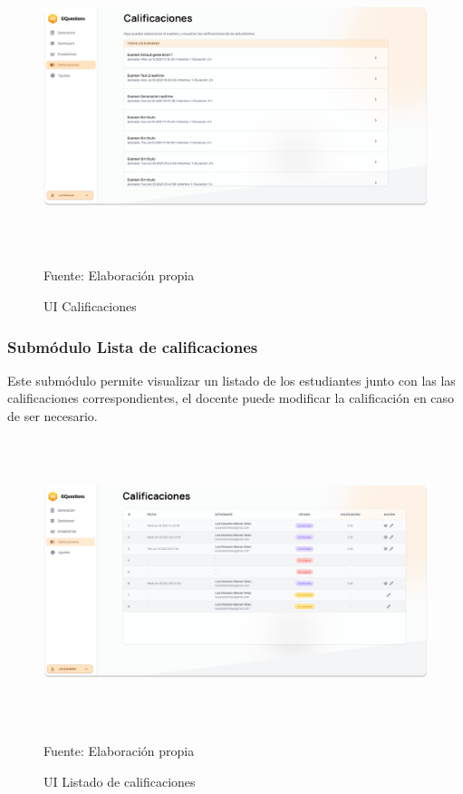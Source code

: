 \documentclass[../Main.tex]{subfiles}
\begin{document}
    \begin{figure}[H]
	\begin{Center}
		\includegraphics[width=6.4in,height=3.3in]{Images/ui_docente_calificaciones.png}
	    \caption{UI Calificaciones}
	    Fuente: Elaboración propia
        \label{fig:section}
	\end{Center}
    \end{figure}
    
    \subsubsection{Submódulo Lista de calificaciones}
    \begin{justify}
    Este submódulo permite visualizar un listado de los estudiantes junto con las las calificaciones correspondientes, el docente puede modificar la calificación en caso de ser necesario.
    \end{justify}

    \begin{figure}[H]
	\begin{Center}
		\includegraphics[width=6.4in,height=3.3in]{Images/ui_docente_listado_calificaciones.png}
	    \caption{UI Listado de calificaciones}
	    Fuente: Elaboración propia
        \label{fig:section}
	\end{Center}
    \end{figure}
    
\end{document}
